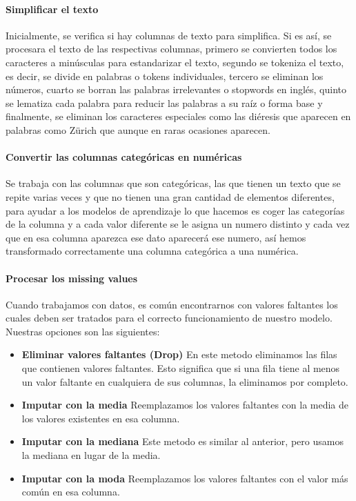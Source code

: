 \documentclass{report}
\begin{document}
{                \paragraph*{Simplificar el texto} {
                    Inicialmente, se verifica si hay columnas de texto para simplifica. Si es así, se procesara el texto de las respectivas columnas, primero se convierten todos los caracteres a minúsculas para estandarizar el texto, segundo se tokeniza el texto, es decir, se divide en palabras o tokens individuales, tercero se eliminan los números, cuarto se borran las palabras irrelevantes o stopwords en inglés, quinto se lematiza cada palabra para reducir las palabras a su raíz o forma base y finalmente, se eliminan los caracteres especiales como las diéresis que aparecen en palabras como Zürich que aunque en raras ocasiones aparecen. }
                \paragraph*{Convertir las columnas categóricas en numéricas} {
                    Se trabaja con las columnas que son categóricas, las que tienen un texto que se repite varias veces y que no tienen una gran cantidad de elementos diferentes, para ayudar a los modelos de aprendizaje lo que hacemos es coger las categorías de la columna y a cada valor diferente se le asigna un numero distinto y cada vez que en esa columna aparezca ese dato aparecerá ese numero, así hemos transformado correctamente una columna categórica a una numérica.}
                \paragraph*{Procesar los missing values} { 
                    Cuando trabajamos con datos, es común encontrarnos con valores faltantes los cuales deben ser tratados para el correcto funcionamiento de nuestro modelo. 
                    Nuestras opciones son las siguientes:
                \begin{itemize}
                    \item \textbf{Eliminar valores faltantes (Drop)}  
                    {En este metodo eliminamos las filas que contienen valores faltantes. Esto significa que si una fila tiene al menos un valor faltante en cualquiera de sus columnas, la eliminamos por completo.}
                    \item \textbf{Imputar con la media}  
                      {Reemplazamos los valores faltantes con la media de los valores existentes en esa columna.}
                    \item \textbf{Imputar con la mediana}  
                      {Este metodo es similar al anterior, pero usamos la mediana en lugar de la media.}
                    \item \textbf{Imputar con la moda}  
                      { Reemplazamos los valores faltantes con el valor más común en esa columna.}
                \end{itemize}
}}
\end{document}
